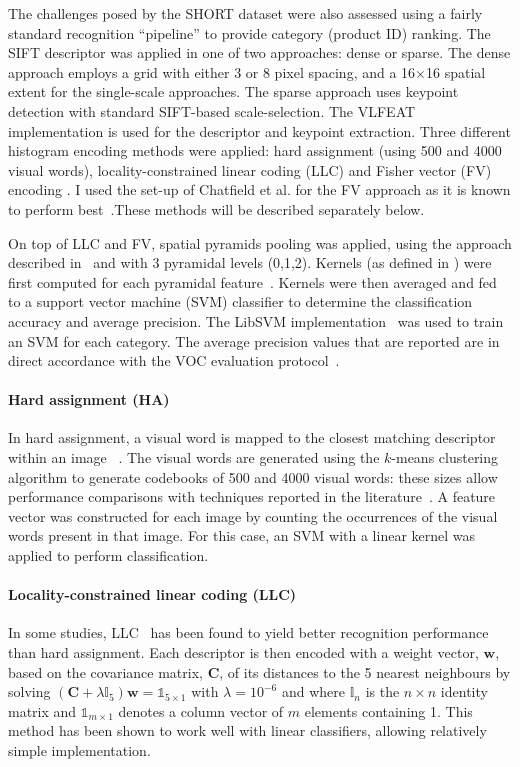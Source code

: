 The challenges posed by the SHORT dataset were also assessed using a fairly standard recognition ``pipeline'' to provide category (product ID) ranking. The SIFT descriptor was applied in one of two approaches: dense or sparse. The dense approach employs a grid with either 3 or 8 pixel spacing, and a 16$\times$16 spatial extent for the single-scale approaches. The sparse approach uses keypoint detection with standard SIFT-based scale-selection. The VLFEAT implementation is used for the descriptor and keypoint extraction. Three different histogram encoding methods were applied: hard assignment \cite{Csurka2004} (using 500 and 4000 visual words), locality-constrained linear coding (LLC) \cite{Wang2010} and Fisher vector (FV) encoding \cite{Perronnin2010}. I used the set-up of Chatfield et al. for the FV approach as it is known to perform best~\cite{Chatfield2011}.These methods will be described separately below. 

On top of LLC and FV, spatial pyramids pooling was applied, using the approach described in~\cite{Lazebnik2006} and with 3 pyramidal levels (0,1,2). Kernels (as defined in \cite{vedaldi2012efficient}) were first computed for each pyramidal feature~\cite{VanDeSande2010}. Kernels were then averaged and fed to a support vector machine (SVM) classifier to determine the classification accuracy and average precision. The LibSVM implementation~\cite{CC01a} was used to train an SVM for each category. The average precision values that are reported are in direct accordance with the VOC evaluation protocol~\cite{everingham2010pascal}. 

\paragraph{Hard assignment (HA)} 
In hard assignment, a visual word is mapped to the closest matching descriptor within an image ~\cite{Csurka2004}. The visual words are generated using the $k$-means clustering algorithm to generate codebooks of 500 and 4000 visual words: these sizes allow performance comparisons with techniques reported in the literature~\cite{Chatfield2011}. A feature vector was constructed for each image by counting the occurrences of the visual words present in that image. For this case, an SVM with a linear kernel was applied to perform classification. 

\paragraph{Locality-constrained linear coding (LLC)} 
In some studies, LLC~\cite{Wang2010} has been found to yield better recognition performance than hard assignment. Each descriptor is then encoded with a weight vector, $\mathbf{w}$, based on the covariance matrix, $\mathbf{C}$, of its distances to the 5 nearest neighbours by solving $(\mathbf{C} + \lambda \mathbb{I}_{5})\mathbf{w} = \mathds{1}_{5\times 1}$ with $\lambda=10^{-6}$ and where $\mathbb{I}_n$ is the $n\times n$ identity matrix and $\mathds{1}_{m\times 1}$ denotes a column vector of $m$ elements containing 1. This method has been shown to work well with linear classifiers, allowing relatively simple implementation.


